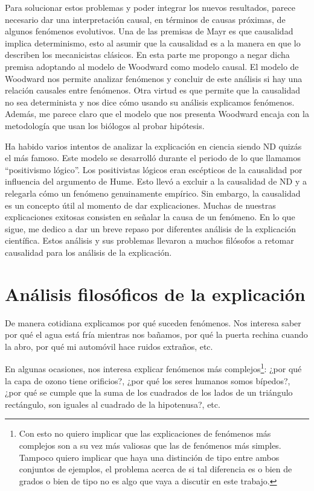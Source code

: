 Para solucionar estos problemas y poder integrar los nuevos resultados, parece necesario dar una interpretación causal, en términos de causas próximas, de algunos fenómenos evolutivos. Una de las premisas de Mayr es que causalidad implica determinismo, esto al asumir que la causalidad es a la manera en que lo describen los mecanicistas clásicos. En esta parte me propongo a negar dicha premisa adoptando al modelo de Woodward como modelo causal. El modelo de Woodward nos permite analizar fenómenos y concluir de este análisis si hay una relación causales entre fenómenos. Otra virtud es que permite que la causalidad no sea determinista y nos dice cómo usando su análisis explicamos fenómenos. Además, me parece claro que el modelo que nos presenta Woodward encaja con la metodología que usan los biólogos al probar hipótesis.

Ha habido varios intentos de analizar la explicación en ciencia siendo ND quizás el más famoso.  Este modelo se desarrolló durante el periodo de lo que llamamos ``positivismo lógico''. Los positivistas lógicos eran escépticos de la causalidad por influencia del argumento de Hume. Esto llevó a excluir a la causalidad de ND y a relegarla cómo un fenómeno genuinamente empírico. Sin embargo, la causalidad es un concepto útil al momento de dar explicaciones. Muchas de nuestras explicaciones exitosas consisten en señalar la causa de un fenómeno. En lo que sigue, me dedico a dar un breve repaso por diferentes análisis de la explicación científica. Estos análisis y sus problemas llevaron a muchos filósofos a retomar causalidad para los análisis de la explicación.

\section{Análisis filosóficos de la explicación}

\noindent De manera cotidiana explicamos por qué suceden fenómenos. Nos interesa saber por qué el agua está fría mientras nos bañamos, por qué la puerta rechina cuando la abro, por qué mi automóvil hace ruidos extraños, etc.

En algunas ocasiones, nos interesa explicar fenómenos más complejos\footnote{Con esto no quiero implicar que las explicaciones de fenómenos más complejos son a su vez más valiosas que las de fenómenos más simples. Tampoco quiero implicar que haya una distinción de tipo entre ambos conjuntos de ejemplos, el problema acerca de si tal diferencia es o bien de grados o bien de tipo no es algo que vaya a discutir en este trabajo.}: ¿por qué la capa de ozono tiene orificios?, ¿por qué los seres humanos somos bípedos?, ¿por qué se cumple que la suma de los cuadrados de los lados de un triángulo rectángulo, son iguales al cuadrado de la hipotenusa?, etc.

